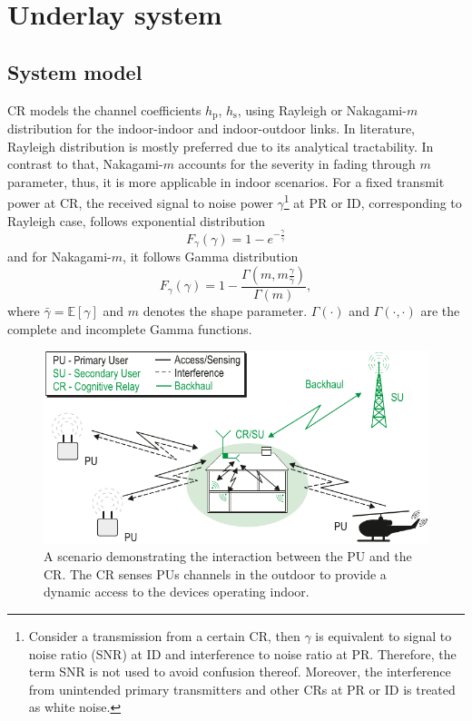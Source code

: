 \section{Underlay system}

\subsection{System model}
CR models the channel coefficients $h_\text{p}$, $h_\text{s}$, using Rayleigh or Nakagami-$m$ distribution for the indoor-indoor and indoor-outdoor links. In literature, Rayleigh distribution is mostly preferred due to its analytical tractability. In contrast to that, Nakagami-$m$ accounts for the severity in fading through $m$ parameter, thus, it is more applicable in indoor scenarios. For a fixed transmit power at CR, the received signal to noise power $\gamma$\footnote{Consider a transmission from a certain CR, then $\gamma$ is equivalent to signal to noise ratio (SNR) at ID and interference to noise ratio at PR. Therefore, the term SNR is not used to avoid confusion thereof. Moreover, the interference from unintended primary transmitters and other CRs at PR or ID is treated as white noise.} at PR or ID, corresponding to Rayleigh case, follows exponential distribution \cite{simon2005}
\begin{equation}
\label{eq:expo}
F_{\gamma}(\gamma) = 1 - e^{- \frac{\gamma}{\bar{\gamma}} }
\end{equation}
and for Nakagami-$m$, it follows Gamma distribution \cite{simon2005}
\begin{equation}
\label{eq:gamma}
F_{\gamma}(\gamma) = 1 - \frac{ \Gamma{ \left( m, m \frac{\gamma}{\bar{\gamma}} \right) }}{\Gamma(m)},
\end{equation}
where $\bar{\gamma} = \mathbb{E}[\gamma]$ and $m$ denotes the shape parameter. $\Gamma(\cdot)$ and $\Gamma(\cdot,\cdot)$ are the complete and incomplete Gamma functions. 


\begin{figure}[!t]
        \centering
        \includegraphics[width = \columnwidth]{../kapitel05/figures/wo_channels_CR_Scenario_farbig_general}
        \caption{A scenario demonstrating the interaction between the PU and the CR. The CR senses PUs channels in the outdoor to provide a dynamic access to the devices operating indoor.}
        \label{fig:scenario}
\end{figure}

